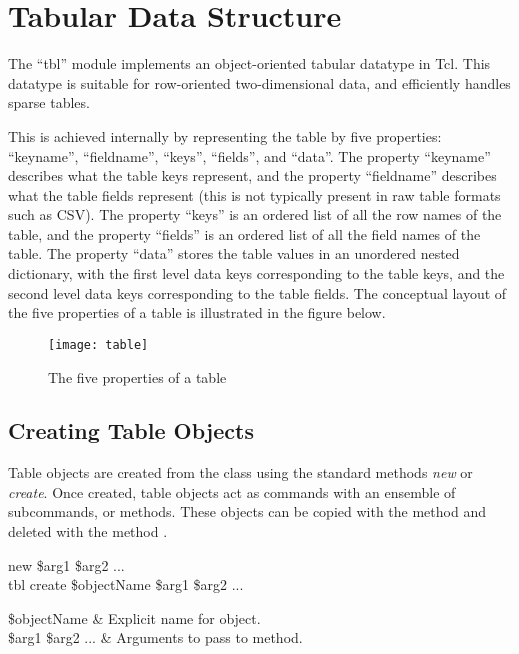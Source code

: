 \cleartooddpage[\thispagestyle{empty}]
\chapter{Tabular Data Structure}\label{tbl}
The ``tbl'' module implements an object-oriented tabular datatype in Tcl. 
This datatype is suitable for row-oriented two-dimensional data, and efficiently handles sparse tables. 

This is achieved internally by representing the table by five properties: ``keyname'', ``fieldname'', ``keys'', ``fields'', and ``data''. The property ``keyname'' describes what the table keys represent, and the property ``fieldname'' describes what the table fields represent (this is not typically present in raw table formats such as CSV). The property ``keys'' is an ordered list of all the row names of the table, and the property ``fields'' is an ordered list of all the field names of the table. The property ``data'' stores the table values in an unordered nested dictionary, with the first level data keys corresponding to the table keys, and the second level data keys corresponding to the table fields. The conceptual layout of the five properties of a table is illustrated in the figure below.
\vspace{\baselineskip}
\FloatBarrier
\begin{figure}[!htb]
    \centering
    \texttt{[image: table]}
    \caption{The five properties of a table}
    \label{fig:table_props}
\end{figure}
\clearpage
\section{Creating Table Objects}
Table objects are created from the  class using the standard methods \textit{new} or \textit{create}. 
Once created, table objects act as commands with an ensemble of subcommands, or methods. 
These objects can be copied with the method  and deleted with the method .
\begin{syntax}
 new \$arg1 \$arg2 ...\\
tbl create \$objectName \$arg1 \$arg2 ...
\end{syntax}
\begin{args}
\$objectName & Explicit name for object. \\
\$arg1 \$arg2 ... & Arguments to pass to  method.
\end{args}

